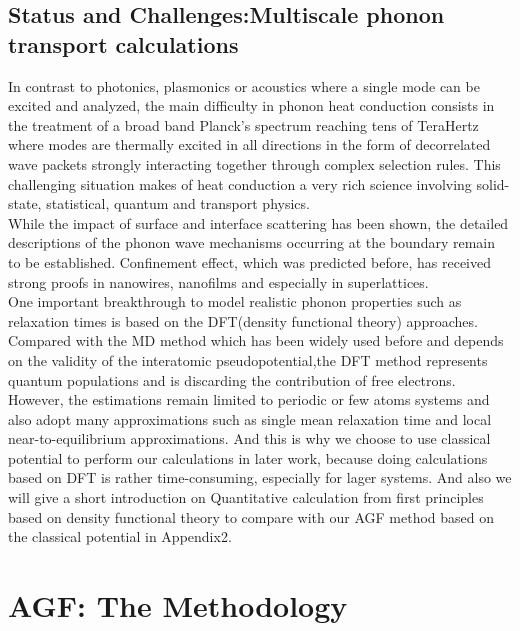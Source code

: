 \subsection{Status and Challenges:Multiscale phonon transport calculations}
In contrast to photonics, plasmonics or acoustics where a single mode can be excited and analyzed, the main difficulty in phonon heat conduction consists in the treatment of a broad band Planck’s spectrum reaching tens of TeraHertz where modes are thermally excited in all directions in the form of decorrelated wave packets strongly interacting together through complex selection rules. This challenging situation makes of heat conduction a very rich science involving solid-state, statistical, quantum and transport physics\cite{Volz1}.\\
\indent While the impact of surface and interface scattering has been shown\cite{VolzSeba}, the detailed descriptions of the phonon wave mechanisms occurring at the boundary remain to be established. Confinement effect, which was predicted\cite{Baltes,Montroll} before, has received strong proofs in nanowires, nanofilms\cite{kazan} and especially in superlattices\cite{Luckyanova,Ravichandran}.\\
\indent One important breakthrough to model  realistic phonon properties such as relaxation times is based on the DFT(density functional theory) approaches\cite{Ward}.
Compared with the MD method\cite{Ladd,Volz2} which has been widely used before and depends on the validity of the interatomic pseudopotential,the DFT method represents quantum populations and is discarding the contribution of free electrons.
However, the estimations remain limited to periodic or few atoms systems and also adopt many approximations such as single mean relaxation time and local near-to-equilibrium approximations. And this is why we choose to use classical potential to perform our calculations in later work, because doing calculations based on DFT is rather time-consuming, especially for lager systems. And also we will give a short introduction on Quantitative calculation from first principles based on density functional theory to compare with our AGF method based on the classical potential in Appendix2.


\section[Methodology: The Atomistic Green,s Function Method]{AGF: The Methodology}
